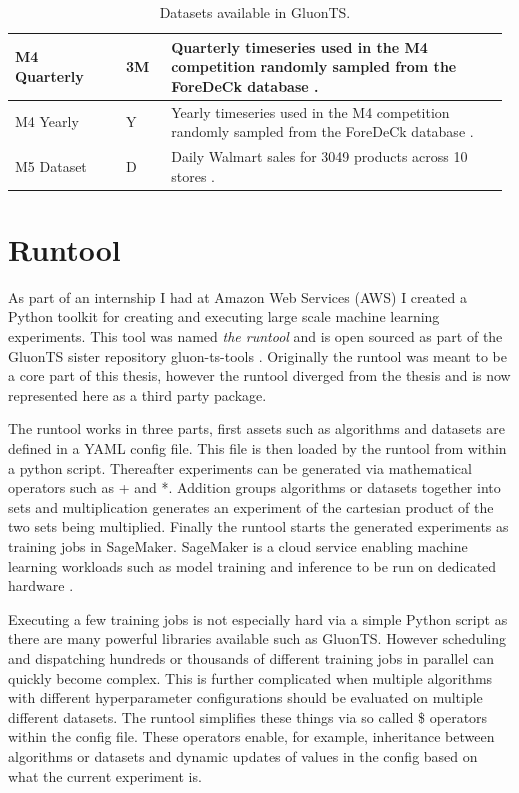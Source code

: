 \begin{table}[h]
\begin{tabular}{p{0.22\linewidth} | p{0.09\linewidth} | p{0.67\linewidth}}
    \hline
    M4 Quarterly       & 3M     & Quarterly timeseries used in the M4 competition randomly sampled from the ForeDeCk database \cite{makridakis_m4_2020}.                                                                                                                                            \\
    \hline
    M4 Yearly          & Y      & Yearly timeseries used in the M4 competition randomly sampled from the ForeDeCk database \cite{makridakis_m4_2020}.                                                                                                                                               \\
    \hline
    M5 Dataset         & D      & Daily Walmart sales for 3049 products across 10 stores \cite{gluonts-github, m5}.
  \end{tabular}
  \caption{Datasets available in GluonTS.}
  \label{tab:datasets}
\end{table}
\clearpage
\section{Runtool}
\label{subsec:runtool}

As part of an internship I had at Amazon Web Services (AWS) I created a Python toolkit for creating and executing large scale machine learning experiments. This tool was named \textit{the runtool} and is open sourced as part of the GluonTS sister repository gluon-ts-tools \cite{the_runtool}. Originally the runtool was meant to be a core part of this thesis, however the runtool diverged from the thesis and is now represented here as a third party package.

The runtool works in three parts, first assets such as algorithms and datasets are defined in a YAML config file. This file is then loaded by the runtool from within a python script. Thereafter experiments can be generated via mathematical operators such as + and *. Addition groups algorithms or datasets together into sets and multiplication generates an experiment of the cartesian product of the two sets being multiplied. Finally the runtool starts the generated experiments as training jobs in SageMaker. SageMaker is a cloud service enabling machine learning workloads such as model training and inference to be run on dedicated hardware \cite{sagemaker_website}.

Executing a few training jobs is not especially hard via a simple Python script as there are many powerful libraries available such as GluonTS. However scheduling and dispatching hundreds or thousands of different training jobs in parallel can quickly become complex. This is further complicated when multiple algorithms with different hyperparameter configurations should be evaluated on multiple different datasets. The runtool simplifies these things via so called \$ operators within the config file. These operators enable, for example, inheritance between algorithms or datasets and dynamic updates of values in the config based on what the current experiment is.

